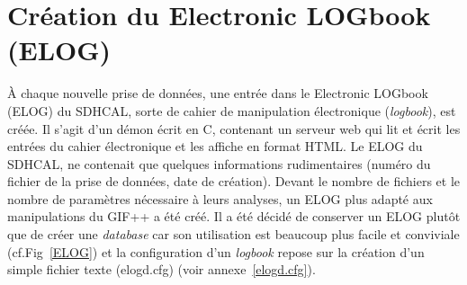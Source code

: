 \vspace*{-0.2cm}
\section{Création du Electronic LOGbook (ELOG)}
\vspace*{-0.4cm}
À chaque nouvelle prise de données, une entrée dans le Electronic LOGbook (ELOG) \cite{ELOG} du SDHCAL, sorte de cahier de manipulation électronique (\textit{logbook}), est créée. Il s'agit d'un démon écrit en C, contenant un serveur web qui lit et écrit les entrées du cahier électronique et les affiche en format HTML. Le ELOG du SDHCAL, ne contenait que quelques informations rudimentaires (numéro du fichier de la prise de données, date de création). Devant le nombre de fichiers et le nombre de paramètres nécessaire à leurs analyses, un ELOG plus adapté aux manipulations du GIF++ a été créé. Il a été décidé de conserver un ELOG plutôt que de créer une \textit{database} car son utilisation est beaucoup plus facile  et conviviale (cf.Fig~\ref{ELOG}) et la configuration d'un \textit{logbook} repose sur la création d'un simple fichier texte (elogd.cfg) (voir annexe~\ref{elogd.cfg}).

